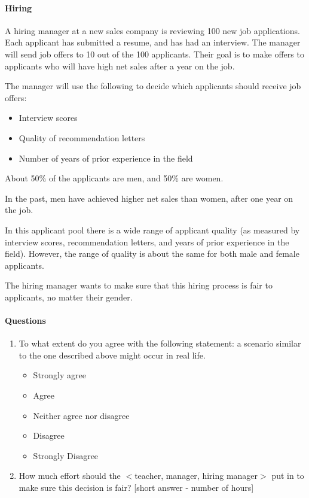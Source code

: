 \documentclass{article}
\begin{document}
\paragraph{Hiring}
A hiring manager at a new sales company is reviewing 100 new job applications. Each applicant has submitted a resume, and has had an interview. The manager will send job offers to 10 out of the 100 applicants. Their goal is to make offers to applicants who will have high net sales after a year on the job.  

The manager will use the following to decide which applicants should receive job offers:
\begin{itemize}
    \item Interview scores
    \item Quality of recommendation letters
    \item Number of years of prior experience in the field
\end{itemize}

About 50\% of the applicants are men, and 50\% are women.  

In the past, men have achieved higher net sales than women, after one year on the job. 

In this applicant pool there is a wide range of applicant quality (as measured by interview scores, recommendation letters, and years of prior experience in the field). However, the range of quality is about the same for both male and female applicants.

The hiring manager wants to make sure that this hiring process is fair to applicants, no matter their gender. 

\paragraph{Questions}
\begin{enumerate}
    \item To what extent do you agree with the following statement: a scenario similar to the one described above might occur in real life. 
    \begin{itemize}
        \item Strongly agree
        \item Agree
        \item Neither agree nor disagree
        \item Disagree
        \item Strongly Disagree
    \end{itemize}
    \item How much effort should the $<$teacher, manager, hiring manager$>$ put in to make sure this decision is fair? [short answer - number of hours]
\end{enumerate}
\end{document}
